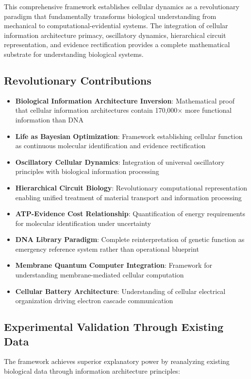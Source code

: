 \documentclass[12pt,a4paper]{article}
\begin{document}
This comprehensive framework establishes cellular dynamics as a revolutionary paradigm that fundamentally transforms biological understanding from mechanical to computational-evidential systems. The integration of cellular information architecture primacy, oscillatory dynamics, hierarchical circuit representation, and evidence rectification provides a complete mathematical substrate for understanding biological systems.

\subsection{Revolutionary Contributions}

\begin{itemize}
\item \textbf{Biological Information Architecture Inversion}: Mathematical proof that cellular information architectures contain 170,000× more functional information than DNA
\item \textbf{Life as Bayesian Optimization}: Framework establishing cellular function as continuous molecular identification and evidence rectification
\item \textbf{Oscillatory Cellular Dynamics}: Integration of universal oscillatory principles with biological information processing
\item \textbf{Hierarchical Circuit Biology}: Revolutionary computational representation enabling unified treatment of material transport and information processing
\item \textbf{ATP-Evidence Cost Relationship}: Quantification of energy requirements for molecular identification under uncertainty
\item \textbf{DNA Library Paradigm}: Complete reinterpretation of genetic function as emergency reference system rather than operational blueprint
\item \textbf{Membrane Quantum Computer Integration}: Framework for understanding membrane-mediated cellular computation
\item \textbf{Cellular Battery Architecture}: Understanding of cellular electrical organization driving electron cascade communication
\end{itemize}

\subsection{Experimental Validation Through Existing Data}

The framework achieves superior explanatory power by reanalyzing existing biological data through information architecture principles:
\end{document}
